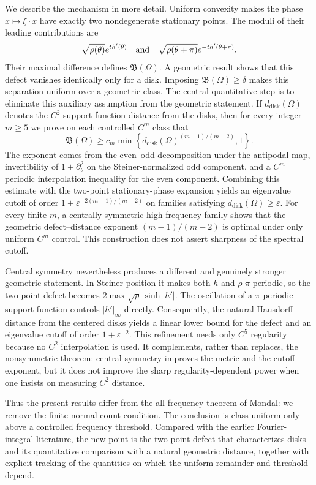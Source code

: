 \documentclass[12pt]{article}
\numberwithin{equation}{section}
\numberwithin{equation}{section}
\begin{document}
We describe the mechanism in more detail. Uniform convexity makes
the phase $x\mapsto\xi\cdot x$ have exactly two nondegenerate stationary
points. The moduli of their leading contributions are
\[
 \sqrt{\rho(\theta)}e^{t h'(\theta)}
 \quad\hbox{and}\quad
 \sqrt{\rho(\theta+\pi)}e^{-t h'(\theta+\pi)}.
\]
Their maximal difference defines $\mathfrak B(\Omega)$. A geometric result
shows that this defect vanishes identically only for a disk. Imposing $\mathfrak B(\Omega)\geq\delta$ makes this
separation uniform over a geometric class. The central quantitative step is
to eliminate this auxiliary assumption from the geometric statement. If
$d_{\mathrm{disk}}(\Omega)$ denotes the $C^2$ support-function distance from the
disks, then for every integer $m\geq5$ we prove on each controlled $C^m$
class that
\[
\mathfrak{B}(\Omega)\geq
 c_m\min\left\{
 d_{\mathrm{disk}}(\Omega)^{(m-1)/(m-2)},1\right\}.
\]
The exponent comes from the even--odd decomposition under the antipodal map,
invertibility of $1+\partial_\theta^2$ on the Steiner-normalized odd
component, and a $C^m$ periodic interpolation inequality for the even
component. Combining this estimate with the two-point stationary-phase
expansion yields an eigenvalue cutoff of order
$1+\varepsilon^{-2(m-1)/(m-2)}$ on families satisfying
$d_{\mathrm{disk}}(\Omega)\geq\varepsilon$. For every finite $m$, a centrally symmetric
high-frequency family shows that the geometric defect--distance exponent
$(m-1)/(m-2)$ is optimal under only uniform $C^m$ control.  This construction
does not assert sharpness of the spectral cutoff.

Central symmetry nevertheless produces a different and genuinely stronger
geometric statement. In Steiner position it makes both $h$ and $\rho$
$\pi$-periodic, so the two-point defect becomes
$2\max\sqrt\rho\,\sinh\left\vert h'\right\vert$. The oscillation of a $\pi$-periodic support
function controls $\left\vert h'\right\vert_\infty$ directly. Consequently, the natural
Hausdorff distance from the centered disks yields a linear lower bound for
the defect and an eigenvalue cutoff of order $1+\varepsilon^{-2}$. This
refinement needs only $C^5$ regularity because no $C^2$ interpolation is
used. It complements, rather than replaces, the nonsymmetric theorem:
central symmetry improves the metric and the cutoff exponent, but it does
not improve the sharp regularity-dependent power when one insists on
measuring $C^2$ distance.

Thus the present results differ from the all-frequency theorem of Mondal:
we remove the finite-normal-count condition. The
conclusion is class-uniform only above a controlled frequency threshold.
Compared with the earlier Fourier-integral
literature, the new point is the two-point defect that characterizes disks
and its quantitative comparison with a natural geometric distance, together
with explicit tracking of the quantities on which the uniform remainder and
threshold depend.
\end{document}
